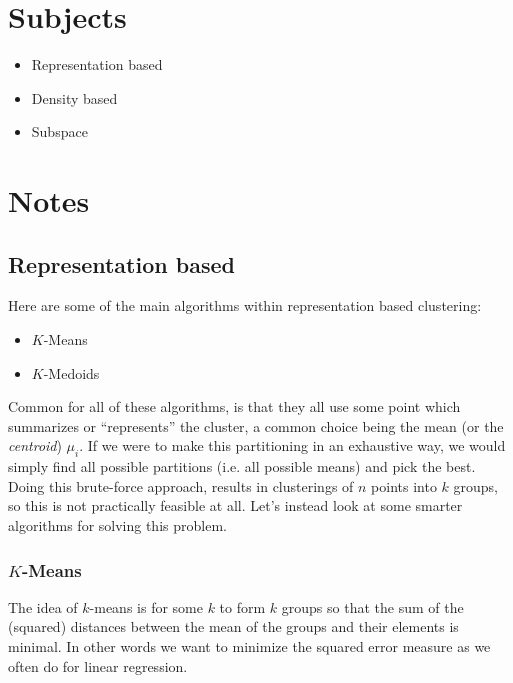 


    \section{Subjects}
    \begin{itemize}
        \item Representation based
        \item Density based
        \item Subspace
    \end{itemize}
    
    \section{Notes}
    
    \subsection{Representation based}
    Here are some of the main algorithms within representation based clustering:
    \begin{itemize}
        \item $K$-Means
        \item $K$-Medoids
    \end{itemize}
    Common for all of these algorithms, is that they all use some point which 
    summarizes or ``represents'' the cluster, a common choice being the mean 
    (or the \textit{centroid}) $\mu_i$. If we were to make this partitioning in 
    an exhaustive way, we would simply find all possible partitions (i.e. all 
    possible means) and pick the best. Doing this brute-force approach, results 
    in  clusterings of $n$ points into $k$ groups, so this is not 
    practically feasible at all. Let's instead look at some smarter algorithms 
    for solving this problem.
    
    \subsubsection{$K$-Means}
    The idea of $k$-means is for some $k$ to form $k$ groups so that the sum of 
    the (squared) distances between the mean of the groups and their elements 
    is minimal. In other words we want to minimize the squared error measure as 
    we often do for linear regression.
    
